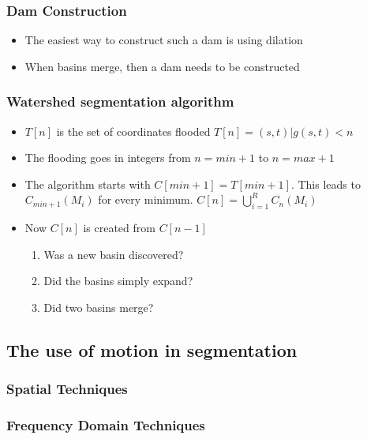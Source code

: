 \subsubsection{Dam Construction}
\begin{itemize}
\item The easiest way to construct such a dam is using dilation
\item When basins merge, then a dam needs to be constructed
\end{itemize}
\subsubsection{Watershed segmentation algorithm}
\begin{itemize}
\item $T[n]$ is the set of coordinates flooded $T[n] = {(s,t)|g(s,t)<n}$
\item The flooding goes in integers from $n=min+1$ to $n=max+1$
\item The algorithm starts with $C[min+1]=T[min+1]$. This leads to $C_{min+1}(M_i)$ for every minimum. $C[n]=\bigcup\limits_{i=1}^{R}C_n(M_i)$
\item Now $C[n]$ is created from $C[n-1]$
\begin{enumerate}
\item Was a new basin discovered?
\item Did the basins simply expand?
\item Did two basins merge?
\end{enumerate}
\end{itemize}
\subsection{The use of motion in segmentation}
\subsubsection{Spatial Techniques}
\subsubsection{Frequency Domain Techniques}
